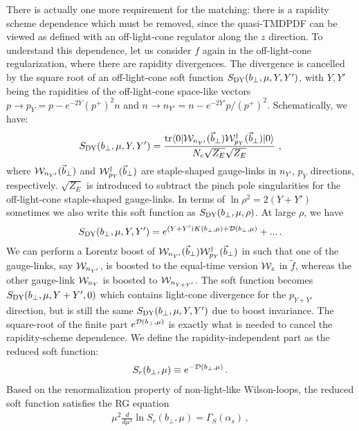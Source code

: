 There is actually one more requirement for the matching: there is a rapidity scheme dependence which must
be removed, since the quasi-TMDPDF can be viewed as defined with an off-light-cone regulator along the $z$ direction. To understand this dependence, let us consider $f$ again in the off-light-cone regularization, where there are rapidity divergences. The divergence is cancelled by the square root of an off-light-cone soft function $S_{\rm DY}(b_\perp,\mu,Y,Y')$, with $Y,Y'$ being the rapidities of the off-light-cone space-like vectors $p\rightarrow p_Y= p-e^{-2Y}(p^+)^2n $ and $n \rightarrow n_{Y'}=n-e^{-2Y'}p/(p^+)^2$. Schematically, we have:
\begin{align}\label{eq:S_DY}
	S_{\rm DY}(b_\perp,\mu,Y,Y')= \frac{{\rm tr}\langle 0|{\cal W}_{n_{Y'}}(\vec{b}_\perp) {\cal W}^{\dagger}_{p_Y}(\vec{b}_\perp)|0\rangle}{N_c\sqrt{Z_E}\sqrt{Z_E}}  \ ,
\end{align}
where ${\cal W}_{n_{Y'}}(\vec{b}_\perp)$ and ${\cal W}^{\dagger}_{p_Y}(\vec{b}_\perp)$ are staple-shaped gauge-links in $n_{Y'}$, $p_Y$ directions, respectively. $\sqrt{Z_E}$ is introduced to subtract the pinch pole singularities for the off-light-cone staple-shaped gauge-links. In terms of $\ln \rho^2=2(Y+Y')$ sometimes we also write this soft function as $S_{\rm DY}(b_\perp,\mu,\rho)$. At large $\rho $, we have
\begin{align}
	S_{\rm DY}(b_\perp,\mu,Y,Y')= e^{(Y+Y') K(b_\perp,\mu)+{\cal D}(b_\perp,\mu)}+... \,.
\end{align}
We can perform a Lorentz boost of ${\cal W}_{n_{Y'}}(\vec{b}_\perp) {\cal W}^{\dagger}_{p_Y}(\vec{b}_\perp)$ in  such that one of the gauge-links, say ${\cal W}_{n_{Y'}}$, is boosted to the equal-time version ${\cal W}_z$ in $\tilde f$, whereas the other gauge-link ${\cal W}_{n_{Y}}$ is boosted to ${\cal W}_{n_{Y+Y'}}$. The soft function becomes $S_{\rm DY}(b_\perp,\mu,Y+Y',0)$ which
contains light-cone divergence for the $p_{Y+Y'}$ direction, but is still the same $S_{\rm DY}(b_\perp,\mu,Y,Y')$ due to boost invariance. The square-root of the finite part $e^{{\cal D}(b_\perp,\mu)}$
is exactly what is needed to cancel the rapidity-scheme dependence. We define the rapidity-independent part as
the reduced soft function:
\begin{align}\label{eq:reduced}
	S_r(b_\perp,\mu)\equiv e^{-{\cal D}(b_\perp,\mu)} \,.
\end{align}
Based on the renormalization property of non-light-like Wilson-loops, the reduced soft function satisfies the RG equation
\begin{align}
	\mu^2 \frac{d}{d\mu^2} \ln S_r(b_\perp,\mu)=\Gamma_S(\alpha_s) \,,
\end{align}
